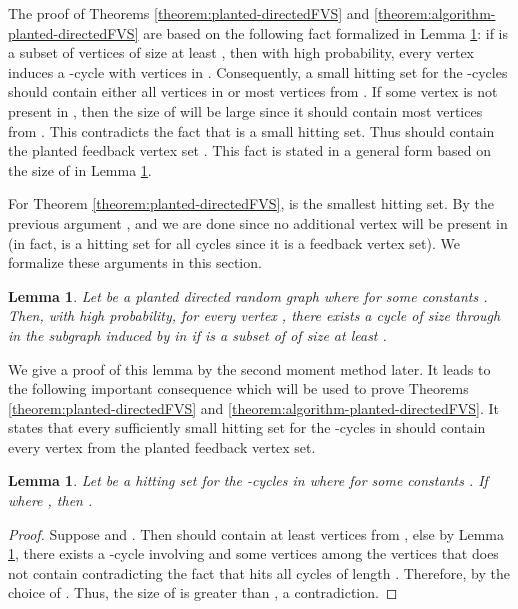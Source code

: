 \documentclass[11pt]{article}
\newtheorem{lemma}[theorem]{Lemma}
\begin{document}
The proof of Theorems \ref{theorem:planted-directedFVS} and \ref{theorem:algorithm-planted-directedFVS} are based on the following fact formalized in Lemma \ref{lemma:cycle-through-every-vertex}: if  is a subset of vertices of size at least , then with high probability, every vertex  induces a -cycle with vertices in . Consequently, a small hitting set  for the -cycles should contain either all vertices in  or most vertices from . If some vertex  is not present in , then the size of  will be large since it should contain most vertices from . This contradicts the fact that  is a small hitting set. Thus  should contain the planted feedback vertex set . This fact is stated in a general form based on the size of  in Lemma \ref{lemma:small-hitting-set-contains-P}.

For Theorem \ref{theorem:planted-directedFVS},  is the smallest hitting set. By the previous argument , and we are done since no additional vertex  will be present in  (in fact,  is a hitting set for all cycles since it is a feedback vertex set). We formalize these arguments in this section.

\begin{lemma}\label{lemma:cycle-through-every-vertex}
Let  be a planted directed random graph where  for some constants . Then, with high probability, for every vertex , there exists a cycle of size  through  in the subgraph induced by  in  if  is a subset of  of size at least .
\end{lemma}

We give a proof of this lemma by the second moment method later. It leads to the following important consequence which will be used to prove Theorems \ref{theorem:planted-directedFVS} and \ref{theorem:algorithm-planted-directedFVS}. It states that every sufficiently small hitting set for the -cycles in  should contain every vertex from the planted feedback vertex set.
\begin{lemma}\label{lemma:small-hitting-set-contains-P}
Let  be a hitting set for the -cycles in  where  for some constants . If  where , then .
\end{lemma}

\begin{proof}
Suppose  and . Then  should contain at least  vertices from , else  by Lemma \ref{lemma:cycle-through-every-vertex}, there exists a -cycle involving  and some  vertices among the  vertices that  does not contain contradicting the fact that  hits all cycles of length . Therefore,  by the choice of . Thus, the size of  is greater than , a contradiction.
\end{proof}
\end{document}

